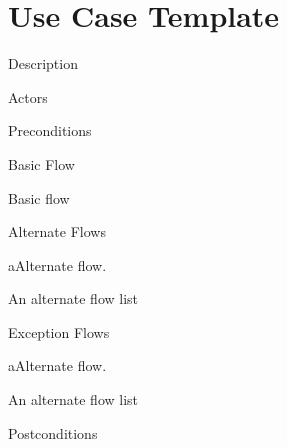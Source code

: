 \section{Use Case Template}

%
\begin{cpart}{Description}

\end{cpart}


%
\begin{cpart}{Actors}

\end{cpart}

%
\begin{cpart}{Preconditions}

\end{cpart}

%
\begin{cpartList}{Basic Flow}
  \item Basic flow
\end{cpartList}

%
\begin{cpartList}{Alternate Flows}
  \begin{innerList}{1}{a}{Alternate flow.}
    \item An alternate flow list
  \end{innerList}
\end{cpartList}

%
\begin{cpartList}{Exception Flows}
  \begin{innerList}{1}{a}{Alternate flow.}
    \item An alternate flow list
  \end{innerList}
\end{cpartList}

%
\begin{cpart}{Postconditions}

\end{cpart}

\clearpage
